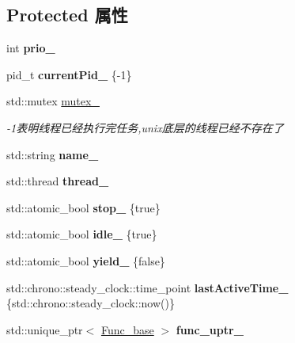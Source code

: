 \subsection*{Protected 属性}
\begin{DoxyCompactItemize}
\item 
\mbox{\label{classThread_ada8c342b34fb001cfcf57619b7150840}} 
int {\bfseries prio\+\_\+}
\item 
\mbox{\label{classThread_a0c0878a96696bbb092a69bc2f1f812fd}} 
pid\+\_\+t {\bfseries current\+Pid\+\_\+} \{-\/1\}
\item 
\mbox{\label{classThread_a82164d41222eaed95bdf85bcc15a6f1a}} 
std\+::mutex \hyperlink{classThread_a82164d41222eaed95bdf85bcc15a6f1a}{mutex\+\_\+}
\begin{DoxyCompactList}\small\item\em -\/1表明线程已经执行完任务,unix底层的线程已经不存在了 \end{DoxyCompactList}\item 
\mbox{\label{classThread_aa222eb32e5fc8f386d9fb018607acd9c}} 
std\+::string {\bfseries name\+\_\+}
\item 
\mbox{\label{classThread_ad313ba812a7875c743dd0d37d565acfb}} 
std\+::thread {\bfseries thread\+\_\+}
\item 
\mbox{\label{classThread_a091bdad0a084b3f2c659f8cdd5369d53}} 
std\+::atomic\+\_\+bool {\bfseries stop\+\_\+} \{true\}
\item 
\mbox{\label{classThread_a13aa04a60328060dec3a25b286c933a2}} 
std\+::atomic\+\_\+bool {\bfseries idle\+\_\+} \{true\}
\item 
\mbox{\label{classThread_a535df3b8fc4ff9ca48f5a6d561162a36}} 
std\+::atomic\+\_\+bool {\bfseries yield\+\_\+} \{false\}
\item 
\mbox{\label{classThread_ae7ed71c6b1f7782ecd4186005fd70760}} 
std\+::chrono\+::steady\+\_\+clock\+::time\+\_\+point {\bfseries last\+Active\+Time\+\_\+} \{std\+::chrono\+::steady\+\_\+clock\+::now()\}
\item 
\mbox{\label{classThread_a677202a7d90ebc5a6d4f8b1eab1a1eac}} 
std\+::unique\+\_\+ptr$<$ \hyperlink{structThread_1_1Func__base}{Func\+\_\+base} $>$ {\bfseries func\+\_\+uptr\+\_\+}
\end{DoxyCompactItemize}



